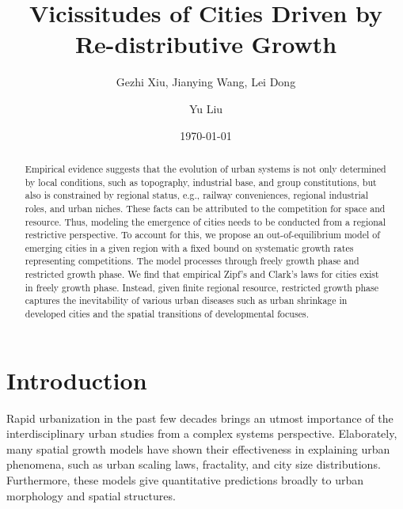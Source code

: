 \documentclass[reprint,unsortedaddress,amsmath,amssymb,aps,prl,showkeys]{revtex4-2}
\begin{document}
\title{Vicissitudes of Cities Driven by Re-distributive Growth}
\author{Gezhi Xiu, Jianying Wang, Lei Dong}
\author{Yu Liu}
\date{\today}

\begin{abstract}
    Empirical evidence suggests that the evolution of urban systems is not only determined by local conditions, such as topography, industrial base, and group constitutions, but also is constrained by regional status, e.g., railway conveniences, regional industrial roles, and urban niches. These facts can be attributed to the competition for space and resource. Thus, modeling the emergence of cities needs to be conducted from a regional restrictive perspective. To account for this, we propose an out-of-equilibrium model of emerging cities in a given region with a fixed bound on systematic growth rates representing competitions. The model processes through freely growth phase and restricted growth phase. We find that empirical Zipf's and Clark's laws for cities exist in freely growth phase. Instead, given finite regional resource, restricted growth phase captures the inevitability of various urban diseases such as urban shrinkage in developed cities and the spatial transitions of developmental focuses. 
\end{abstract}
\maketitle
\section{Introduction}

Rapid urbanization in the past few decades brings an utmost importance of the
interdisciplinary urban studies from a complex systems perspective. Elaborately, many spatial growth models have shown their effectiveness in explaining urban phenomena, such as urban scaling laws\cite{court2013origins}, fractality\cite{batty1994fractal,batty2007cities}, and city size distributions\cite{zipf1949human}. Furthermore, these models give quantitative predictions broadly to urban morphology and spatial structures\cite{anas1998urban}. 
\end{document}
